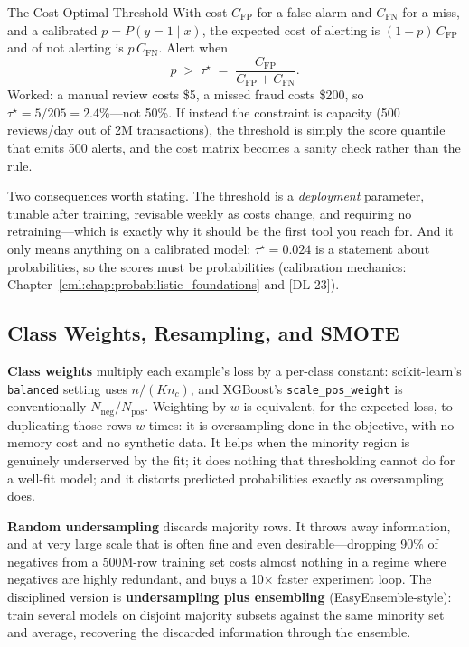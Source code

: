 \begin{mathresult}{The Cost-Optimal Threshold}
With cost $C_{\text{FP}}$ for a false alarm and $C_{\text{FN}}$ for a miss, and a calibrated $p = P(y=1 \mid x)$, the expected cost of alerting is $(1-p)\,C_{\text{FP}}$ and of not alerting is $p\,C_{\text{FN}}$. Alert when
\begin{equation}
p \;>\; \tau^\star \;=\; \frac{C_{\text{FP}}}{C_{\text{FP}} + C_{\text{FN}}}.
\end{equation}
Worked: a manual review costs \$5, a missed fraud costs \$200, so $\tau^\star = 5/205 = 2.4\%$---not 50\%. If instead the constraint is capacity (500 reviews/day out of 2M transactions), the threshold is simply the score quantile that emits 500 alerts, and the cost matrix becomes a sanity check rather than the rule.
\end{mathresult}

Two consequences worth stating. The threshold is a \emph{deployment} parameter, tunable after training, revisable weekly as costs change, and requiring no retraining---which is exactly why it should be the first tool you reach for. And it only means anything on a calibrated model: $\tau^\star = 0.024$ is a statement about probabilities, so the scores must be probabilities (calibration mechanics: Chapter~\ref{cml:chap:probabilistic_foundations} and [DL 23]).

\subsection{Class Weights, Resampling, and SMOTE}

\textbf{Class weights} multiply each example's loss by a per-class constant: scikit-learn's \texttt{balanced} setting uses $n/(K n_c)$, and XGBoost's \texttt{scale\_pos\_weight} is conventionally $N_{\text{neg}}/N_{\text{pos}}$. Weighting by $w$ is equivalent, for the expected loss, to duplicating those rows $w$ times: it is oversampling done in the objective, with no memory cost and no synthetic data. It helps when the minority region is genuinely underserved by the fit; it does nothing that thresholding cannot do for a well-fit model; and it distorts predicted probabilities exactly as oversampling does.

\textbf{Random undersampling} discards majority rows. It throws away information, and at very large scale that is often fine and even desirable---dropping 90\% of negatives from a 500M-row training set costs almost nothing in a regime where negatives are highly redundant, and buys a 10$\times$ faster experiment loop. The disciplined version is \textbf{undersampling plus ensembling} (EasyEnsemble-style): train several models on disjoint majority subsets against the same minority set and average, recovering the discarded information through the ensemble.

